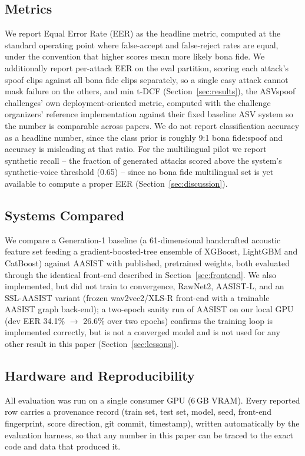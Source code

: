 \documentclass[conference]{IEEEtran}
\begin{document}
\subsection{Metrics}
We report Equal Error Rate (EER) as the headline metric, computed at
the standard operating point where false-accept and false-reject rates
are equal, under the convention that higher scores mean more likely
bona fide. We additionally report per-attack EER on the eval partition,
scoring each attack's spoof clips against all bona fide clips
separately, so a single easy attack cannot mask failure on the others,
and min t-DCF (Section~\ref{sec:results}), the ASVspoof challenges' own
deployment-oriented metric, computed with the challenge organizers'
reference implementation against their fixed baseline ASV system so the
number is comparable across papers.
We do not report classification accuracy as a headline number, since
the class prior is roughly 9:1 bona fide:spoof and accuracy is
misleading at that ratio. For the multilingual pilot we report synthetic
recall -- the fraction of generated attacks scored above the system's
synthetic-voice threshold (0.65) -- since no bona fide multilingual set
is yet available to compute a proper EER (Section~\ref{sec:discussion}).

\subsection{Systems Compared}
We compare a Generation-1 baseline (a 61-dimensional handcrafted
acoustic feature set feeding a gradient-boosted-tree ensemble of
XGBoost, LightGBM and CatBoost) against AASIST with published,
pretrained weights, both evaluated through the identical front-end
described in Section~\ref{sec:frontend}. We also implemented, but did
not train to convergence, RawNet2, AASIST-L, and an SSL-AASIST variant
(frozen wav2vec2/XLS-R front-end with a trainable AASIST graph
back-end); a two-epoch sanity run of AASIST on our local GPU (dev EER
34.1\% $\rightarrow$ 26.6\% over two epochs) confirms the training loop
is implemented correctly, but is not a converged model and is not used
for any other result in this paper (Section~\ref{sec:lessons}).

\subsection{Hardware and Reproducibility}
All evaluation was run on a single consumer GPU (6\,GB VRAM). Every
reported row carries a provenance record (train set, test set, model,
seed, front-end fingerprint, score direction, git commit, timestamp),
written automatically by the evaluation harness, so that any number in
this paper can be traced to the exact code and data that produced it.
\end{document}
